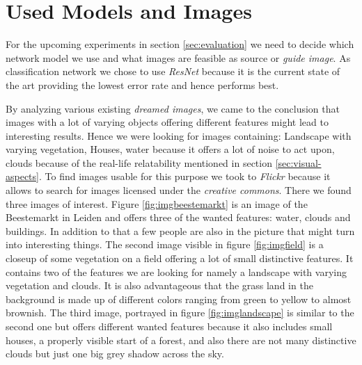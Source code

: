 \section{Used Models and Images}
\label{sec:data}
For the upcoming experiments in section \ref{sec:evaluation} we need to decide which network model we use and what images are feasible as source or \emph{guide image}.
As classification network we chose to use \emph{ResNet} because it is the current state of the art providing the lowest error rate and hence performs best.\cite{cnnComparison}

By analyzing various existing \emph{dreamed images}, we came to the conclusion that images with a lot of varying objects offering different features might lead to interesting results.
Hence we were looking for images containing: Landscape with varying vegetation, Houses, water because it offers a lot of noise to act upon, clouds because of the real-life relatability mentioned in section \ref{sec:visual-aspects}.
To find images usable for this purpose we took to \emph{Flickr} because it allows to search for images licensed under the \emph{creative commons}.
There we found three images of interest. Figure \ref{fig:imgbeestemarkt} is an image of the Beestemarkt in Leiden and offers three of the wanted features: water, clouds and buildings.
In addition to that a few people are also in the picture that might turn into interesting things.
The second image visible in figure \ref{fig:imgfield} is a closeup of some vegetation on a field offering a lot of small distinctive features. It contains two of the features we are looking for namely a landscape with varying vegetation and clouds. It is also advantageous that the grass land in the background is made up of different colors ranging from green to yellow to almost brownish.
The third image, portrayed in figure \ref{fig:imglandscape} is similar to the second one but offers different wanted features because it also includes small houses, a properly visible start of a forest, and also there are not many distinctive clouds but just one big grey shadow across the sky.


